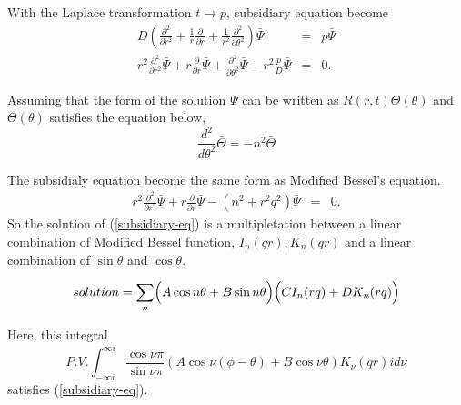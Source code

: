 \documentclass{article}
\begin{document}
With the Laplace transformation $t\rightarrow p$, subsidiary equation become
\begin{eqnarray}
    D\left( \frac{\partial^2}{\partial r^2} +
            \frac{1}{r}\frac{\partial}{\partial r} +
            \frac{1}{r^2}\frac{\partial^2}{\partial \theta^2}
            \right)
    \bar{\Psi}
    &=&
    p\bar{\Psi} \nonumber \\
    r^2 \frac{\partial^2}{\partial r^2}\bar{\Psi} +
    r   \frac{\partial}{\partial r}\bar{\Psi} +
        \frac{\partial^2}{\partial \theta^2}\bar{\Psi} -
    r^2 \frac{p}{D}\bar{\Psi} &=& 0.
\end{eqnarray}

Assuming that the form of the solution $\Psi$ can be written as
 $R(r, t)\Theta(\theta)$ and $\Theta(\theta)$ satisfies the equation below, 
\begin{equation}
    \frac{d^2}{d\theta^2}\bar{\Theta} = -n^2\bar{\Theta}
\end{equation}

The subsidialy equation become the same form as Modified Bessel's equation.
\begin{eqnarray} \label{subsidiary-eq}
    r^2\frac{\partial^2}{\partial r^2}\bar{\Psi} +
    r\frac{\partial}{\partial r}\bar{\Psi} -(n^2 + r^2q^2)\bar{\Psi} &=& 0.
\end{eqnarray}
So the solution of (\ref{subsidiary-eq}) is a multipletation between
 a linear combination of Modified Bessel function, $I_n(qr), K_n(qr)$ and
 a linear combination of $\sin\theta$ and $\cos\theta$.

\begin{equation}\label{solution-of-subsidialy-equation}
    solution = \sum_n\Bigl( A\cos n\theta + B\sin n\theta\Bigr)
    \Bigl(CI_n(rq) + DK_n(rq)\Bigr)
\end{equation}

Here, this integral
\begin{equation}\label{general-integral-form-of-w}
P.V.\int^{\infty i}_{-\infty i}
    \frac{\cos\nu\pi}{\sin\nu\pi}
    (A\cos\nu(\phi - \theta) + B\cos\nu\theta)
    K_\nu(qr)id\nu
\end{equation}
satisfies (\ref{subsidiary-eq}).
\end{document}
